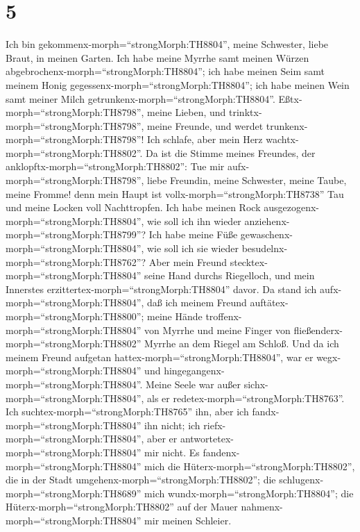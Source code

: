 \hypertarget{section-4}{%
\section{5}\label{section-4}}

 Ich bin gekommenx-morph=``strongMorph:TH8804'', meine
Schwester, liebe Braut, in meinen Garten. Ich habe meine Myrrhe samt
meinen Würzen abgebrochenx-morph=``strongMorph:TH8804''; ich habe meinen
Seim samt meinem Honig gegessenx-morph=``strongMorph:TH8804''; ich habe
meinen Wein samt meiner Milch getrunkenx-morph=``strongMorph:TH8804''.
Eßtx-morph=``strongMorph:TH8798'', meine Lieben, und
trinktx-morph=``strongMorph:TH8798'', meine Freunde, und werdet
trunkenx-morph=``strongMorph:TH8798''!  Ich schlafe, aber
mein Herz wachtx-morph=``strongMorph:TH8802''. Da ist die Stimme meines
Freundes, der anklopftx-morph=``strongMorph:TH8802'': Tue mir
aufx-morph=``strongMorph:TH8798'', liebe Freundin, meine Schwester,
meine Taube, meine Fromme! denn mein Haupt ist
vollx-morph=``strongMorph:TH8738'' Tau und meine Locken voll
Nachttropfen.  Ich habe meinen Rock
ausgezogenx-morph=``strongMorph:TH8804'', wie soll ich ihn wieder
anziehenx-morph=``strongMorph:TH8799''? Ich habe meine Füße
gewaschenx-morph=``strongMorph:TH8804'', wie soll ich sie wieder
besudelnx-morph=``strongMorph:TH8762''?  Aber mein Freund
stecktex-morph=``strongMorph:TH8804'' seine Hand durchs Riegelloch, und
mein Innerstes erzittertex-morph=``strongMorph:TH8804'' davor.
 Da stand ich aufx-morph=``strongMorph:TH8804'', daß ich
meinem Freund auftätex-morph=``strongMorph:TH8800''; meine Hände
troffenx-morph=``strongMorph:TH8804'' von Myrrhe und meine Finger von
fließenderx-morph=``strongMorph:TH8802'' Myrrhe an dem Riegel am Schloß.
 Und da ich meinem Freund aufgetan
hattex-morph=``strongMorph:TH8804'', war er
wegx-morph=``strongMorph:TH8804'' und
hingegangenx-morph=``strongMorph:TH8804''. Meine Seele war außer
sichx-morph=``strongMorph:TH8804'', als er
redetex-morph=``strongMorph:TH8763''. Ich
suchtex-morph=``strongMorph:TH8765'' ihn, aber ich
fandx-morph=``strongMorph:TH8804'' ihn nicht; ich
riefx-morph=``strongMorph:TH8804'', aber er
antwortetex-morph=``strongMorph:TH8804'' mir nicht.  Es
fandenx-morph=``strongMorph:TH8804'' mich die
Hüterx-morph=``strongMorph:TH8802'', die in der Stadt
umgehenx-morph=``strongMorph:TH8802''; die
schlugenx-morph=``strongMorph:TH8689'' mich
wundx-morph=``strongMorph:TH8804''; die
Hüterx-morph=``strongMorph:TH8802'' auf der Mauer
nahmenx-morph=``strongMorph:TH8804'' mir meinen Schleier. 
